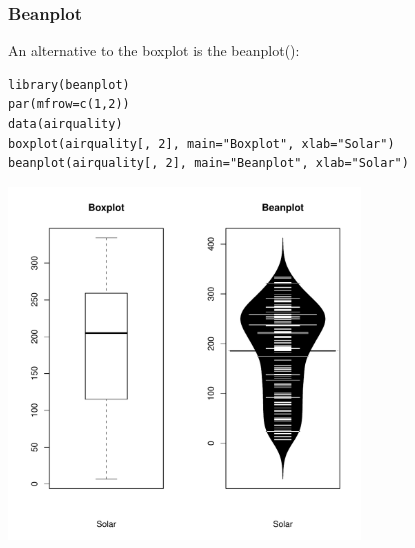 \begin{frame}
\frametitle{Beanplot}

An alternative to the boxplot is the  \ttfamily beanplot(): \normalfont
  		\begin{lstlisting}
library(beanplot)		
par(mfrow=c(1,2))
data(airquality)
boxplot(airquality[, 2], main="Boxplot", xlab="Solar")
beanplot(airquality[, 2], main="Beanplot", xlab="Solar")
		\end{lstlisting}
        \begin{center}
         \includegraphics[width=0.7\textwidth]{images/beanPlot.pdf}
        \end{center}
\end{frame}

